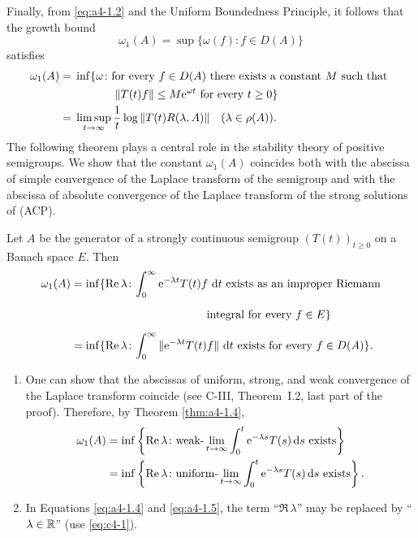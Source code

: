 Finally, from \eqref{eq:a4-1.2} and the Uniform Boundedness Principle, it follows that the growth bound 
%
\[
	\omega_{1}(A) = \sup\{\omega(f) \colon f \in D(A)\}
\]
%
satisfies
\begin{align}
\omega_1(A) &={} \inf \{ \omega \colon \text{for every  $f \in D(A)$  there exists a constant $ M $ such that  }\notag \\
& \phantom{xxxxxxxx} \text{ $\|T(t)f\| \leq M\mathrm{e}^{\omega t}$  for every $t \geq 0$} \} \\
&={}
\limsup_{t \to \infty} \frac{1}{t} \log\|T(t)R(\lambda,A)\| \quad (\lambda \in \rho(A)). 
\notag
\end{align}
The following theorem plays a central role in the stability theory of positive semigroups.
We show that the constant $\omega_{1}(A)$ coincides both with the abscissa of simple convergence of the Laplace transform of the semigroup and with the abscissa of absolute convergence of the Laplace transform of the strong solutions of (ACP).
\begin{theorem}\label{thm:a4-1.4}%
Let $A$ be the generator of a strongly continuous semigroup $ (T(t))_{t \geq 0} $ on a Banach space $E$. 
Then
\begin{align}\label{eq:a4-1.4}
\omega_{1}(A) &= \inf\{\Re\,\lambda \colon {\int_{0}^{\infty} \mathrm{e}^{-\lambda t} T(t)f \,\dt} \text{ exists as an improper Riemann} \\
&\phantom{= \inf\{\Re\,\lambda \colon \int_{0}^{\infty} \mathrm{e}^{-\lambda t} T(t)f} \text{integral for every } f \in E\} \notag \\
&= \inf\{\Re\,\lambda \colon {\int_{0}^{\infty} \|\mathrm{e}^{-\lambda t} T(t)f\| \,\dt} \text{ exists for every } f \in D(A)\}.\notag
\end{align}
\end{theorem}
\begin{remarks*}\label{rem:a4-1.4}%

\begin{enumerate}[\upshape (i), wide, labelindent=.5em]

\item 
One can show that the abscissas of uniform, strong, and weak convergence of the Laplace transform coincide (see C-III, Theorem~I.2, last part of the proof). 
Therefore, by Theorem \ref{thm:a4-1.4},
\begin{align}\label{eq:a4-1.5}
\omega_1(A) &= \inf \left\{ \mathop{}\!\mathrm{Re}\,\lambda\colon\text{weak-} \lim_{t \to \infty} {\int_0^t \mathrm{e}^{-\lambda s} T(s)  \mathop{}\!\mathrm{d}{s}} \text{ exists} \right\}
\\
    &= \inf \left\{ \mathop{}\!\mathrm{Re}\,\lambda\colon\text{uniform-} \lim_{t \to \infty} {\int_0^t \mathrm{e}^{-\lambda s} T(s)  \mathop{}\!\mathrm{d}{s}} \text{ exists} \right\}.\notag
\end{align}

\item
In Equations \eqref{eq:a4-1.4} and \eqref{eq:a4-1.5}, the term \enquote{$\Re\,\lambda$} may be replaced by \enquote{$\lambda \in \mathbb{R}$} (use \eqref{eq:c4-1}).
\end{enumerate}

\end{remarks*}
